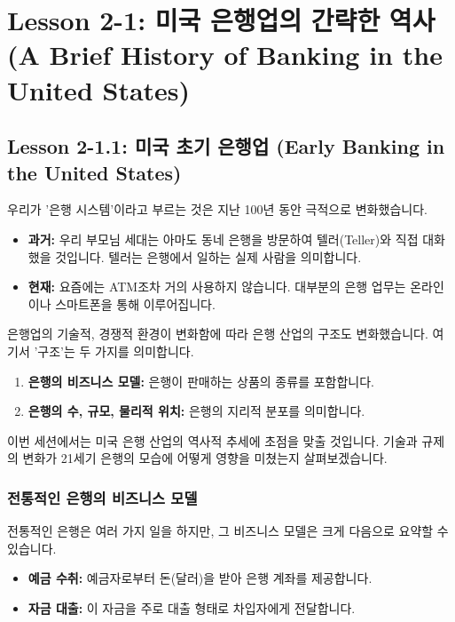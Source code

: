 \documentclass[11pt,a4paper]{book}
\theoremstyle{definition}
\begin{document}
\section{Lesson 2-1: 미국 은행업의 간략한 역사 (A Brief History of Banking in the United States)}

\subsection{Lesson 2-1.1: 미국 초기 은행업 (Early Banking in the United States)}

우리가 '은행 시스템'이라고 부르는 것은 지난 100년 동안 극적으로 변화했습니다.

\begin{itemize}
    \item \textbf{과거:} 우리 부모님 세대는 아마도 동네 은행을 방문하여 텔러(Teller)와 직접 대화했을 것입니다. 텔러는 은행에서 일하는 실제 사람을 의미합니다.
    \item \textbf{현재:} 요즘에는 ATM조차 거의 사용하지 않습니다. 대부분의 은행 업무는 온라인이나 스마트폰을 통해 이루어집니다.
\end{itemize}

은행업의 기술적, 경쟁적 환경이 변화함에 따라 은행 산업의 구조도 변화했습니다. 여기서 '구조'는 두 가지를 의미합니다.
\begin{enumerate}
    \item \textbf{은행의 비즈니스 모델:} 은행이 판매하는 상품의 종류를 포함합니다.
    \item \textbf{은행의 수, 규모, 물리적 위치:} 은행의 지리적 분포를 의미합니다.
\end{enumerate}
이번 세션에서는 미국 은행 산업의 역사적 추세에 초점을 맞출 것입니다. 기술과 규제의 변화가 21세기 은행의 모습에 어떻게 영향을 미쳤는지 살펴보겠습니다.

\subsubsection*{전통적인 은행의 비즈니스 모델}
전통적인 은행은 여러 가지 일을 하지만, 그 비즈니스 모델은 크게 다음으로 요약할 수 있습니다.
\begin{itemize}
    \item \textbf{예금 수취:} 예금자로부터 돈(달러)을 받아 은행 계좌를 제공합니다.
    \item \textbf{자금 대출:} 이 자금을 주로 대출 형태로 차입자에게 전달합니다.
\end{itemize}
\end{document}
